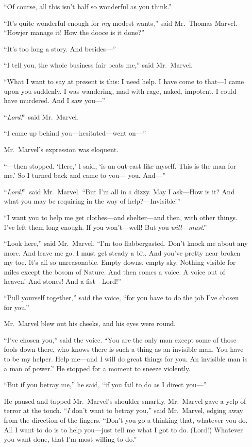 “Of course, all this isn’t half so wonderful as you think.”

“It’s quite wonderful enough for \emph{my} modest wants,” said Mr.\ Thomas Marvel. “Howjer manage it! How the dooce is it done?”

“It’s too long a story. And besides—”

{“I tell you, the whole business fair beats me,” said Mr.\ Marvel.}

“What I want to say at present is this: I need help. I have come to that—I came upon you suddenly. I was wandering, mad with rage, naked, impotent. I could have murdered. And I saw you—”

“\emph{Lord!}” said Mr.\ Marvel.

“I came up behind you—hesitated—went on—”

Mr.\ Marvel’s expression was eloquent.

“—then stopped. ‘Here,’ I said, ‘is an out-cast like myself. This is the man for me.’ So I turned back and came to you— you. And—”

“\emph{Lord!}”\ said Mr.\ Marvel. “But I’m all in a dizzy. May I ask—How is it? And what you may be requiring in the way of help?—Invisible!”

“I want you to help me get clothes—and shelter—and then, with other things. I’ve left them long enough. If you won’t—well! But you \emph{will}—\emph{must}.”

“Look here,” said Mr.\ Marvel. “I’m too flabbergasted. Don’t knock me about any more. And leave me go. I must get steady a bit. And you’ve pretty near broken my toe. It’s all so unreasonable. Empty downs, empty sky. Nothing visible for miles except the bosom of Nature. And then comes a voice. A voice out of heaven! And stones! And a fist—Lord!”

“Pull yourself together,” said the voice, “for you have to do the job I’ve chosen for you.”

Mr.\ Marvel blew out his cheeks, and his eyes were round.

“I’ve chosen you,” said the voice. “You are the only man except some of those fools down there, who knows there is such a thing as an invisible man. You have to be my helper. Help me—and I will do great things for you. An invisible man is a man of power.” He stopped for a moment to sneeze violently.

“But if you betray me,” he said, “if you fail to do as I direct you—”

He paused and tapped Mr.\ Marvel’s shoulder smartly. Mr.\ Marvel gave a yelp of terror at the touch. “\emph{I} don’t want to betray you,” said Mr.\ Marvel, edging away from the direction of the fingers. “Don’t you go a-thinking that, whatever you do. All I want to do is to help you—just tell me what I got to do. (Lord!) Whatever you want done, that I’m most willing to do.”